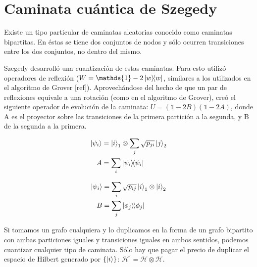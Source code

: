 \section{Caminata cuántica de Szegedy}

Existe un tipo particular de caminatas aleatorias conocido como caminatas bipartitas. En éstas se tiene dos conjuntos de nodos y sólo ocurren transiciones entre los dos conjuntos, no dentro del mismo.

Szegedy desarrolló una cuantización de estas caminatas. Para esto utilizó operadores de reflexión ($W = \mathds{1} - 2 \ketbra{w}{w}$, similares a los utilizados en el algoritmo de Grover [ref]). Aprovechándose del hecho de que un par de reflexiones equivale a una rotación (como en el algoritmo de Grover), creó el siguiente operador de evolución de la caminata: $U = (\mathds{1} - 2 B)(\mathds{1} - 2 A)$, donde A es el proyector sobre las transiciones de la primera partición a la segunda, y B de la segunda a la primera.

\begin{minipage}{0.5\linewidth}
\begin{align*}
\ket{\psi_i} &= \ket{i}_1 \otimes \sum\limits_j \sqrt{p_{j i}} \ket{j}_2 \\
A &= \sum\limits_i \ketbra{\psi_i}{\psi_i}
\end{align*}
\end{minipage}
\begin{minipage}{0.5\linewidth}
\begin{align*}
\ket{\psi_i} &= \sum\limits_i \sqrt{p_{i j}} \ket{i}_1 \otimes \ket{i}_2 \\
B &= \sum\limits_j \ketbra{\phi_j}{\phi_j}
\end{align*}
\end{minipage}

Si tomamos un grafo cualquiera y lo duplicamos en la forma de un grafo bipartito con ambas particiones iguales y transiciones iguales en ambos sentidos, podemos cuantizar cualquier tipo de caminata. Sólo hay que pagar el precio de duplicar el espacio de Hilbert generado por $\{\ket{i}\}$: $\mathcal{H}^\prime = \mathcal{H} \otimes \mathcal{H}$.

